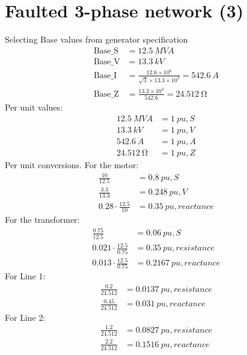 \section{Faulted 3-phase network (3)}
Selecting Base values from generator specification
\begin{align}
    \textrm{Base\_S} & = \SI{12.5}{MVA}                                                         \\
    \textrm{Base\_V} & = \SI{13.3}{kV}                                                          \\
    \textrm{Base\_I} & = \frac{12.6\times 10^6}{\sqrt{3}\times 13.3\times 10^3} = \SI{542.6}{A} \\
    \textrm{Base\_Z} & = \frac{13.3\times 10^3}{542.6} = \SI{24.512}{\ohm}
\end{align}
Per unit values:
\begin{align}
    \SI{12.5}{MVA}    & = \SI{1}{pu,S} \\
    \SI{13.3}{kV}     & = \SI{1}{pu,V} \\
    \SI{542.6}{A}     & = \SI{1}{pu,A} \\
    \SI{24.512}{\ohm} & = \SI{1}{pu,Z}
\end{align}
Per unit conversions. For the motor:
\begin{align}
    \frac{10}{12.5}            & = \SI{0.8}{pu,S}          \\
    \frac{3.3}{13.3}           & = \SI{0.248}{pu,V}        \\
    0.28 \cdot \frac{12.5}{10} & = \SI{0.35}{pu,reactance}
\end{align}
For the transformer:
\begin{align}
    \frac{0.75}{12.5}            & = \SI{0.06}{pu,S}           \\
    0.021\cdot \frac{12.5}{0.75} & = \SI{0.35}{pu,resistance}  \\
    0.013\cdot \frac{12.5}{0.75} & = \SI{0.2167}{pu,reactance}
\end{align}
For Line 1:
\begin{align}
    \frac{0.2}{24.512}  & = \SI{0.0137}{pu,resistance} \\
    \frac{0.45}{24.512} & = \SI{0.031}{pu,reactance}
\end{align}
For Line 2:
\begin{align}
    \frac{1.2}{24.512} & = \SI{0.0827}{pu,resistance} \\
    \frac{2.2}{24.512} & = \SI{0.1516}{pu,reactance}
\end{align}
